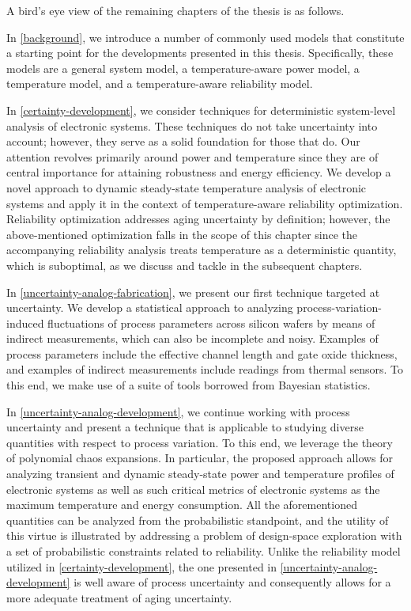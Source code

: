 A bird's eye view of the remaining chapters of the thesis is as follows.

In \cref{background}, we introduce a number of commonly used models that
constitute a starting point for the developments presented in this thesis.
Specifically, these models are a general system model, a temperature-aware power
model, a temperature model, and a temperature-aware reliability model.

In \cref{certainty-development}, we consider techniques for deterministic
system-level analysis of electronic systems. These techniques do not take
uncertainty into account; however, they serve as a solid foundation for those
that do. Our attention revolves primarily around power and temperature since
they are of central importance for attaining robustness and energy efficiency.
We develop a novel approach to dynamic steady-state temperature analysis of
electronic systems and apply it in the context of temperature-aware reliability
optimization. Reliability optimization addresses aging uncertainty by
definition; however, the above-mentioned optimization falls in the scope of this
chapter since the accompanying reliability analysis treats temperature as a
deterministic quantity, which is suboptimal, as we discuss and tackle in the
subsequent chapters.

In \cref{uncertainty-analog-fabrication}, we present our first technique
targeted at uncertainty. We develop a statistical approach to analyzing
process-variation-induced fluctuations of process parameters across silicon
wafers by means of indirect measurements, which can also be incomplete and
noisy. Examples of process parameters include the effective channel length and
gate oxide thickness, and examples of indirect measurements include readings
from thermal sensors. To this end, we make use of a suite of tools borrowed from
Bayesian statistics.

In \cref{uncertainty-analog-development}, we continue working with process
uncertainty and present a technique that is applicable to studying diverse
quantities with respect to process variation. To this end, we leverage the
theory of polynomial chaos expansions. In particular, the proposed approach
allows for analyzing transient and dynamic steady-state power and temperature
profiles of electronic systems as well as such critical metrics of electronic
systems as the maximum temperature and energy consumption. All the
aforementioned quantities can be analyzed from the probabilistic standpoint, and
the utility of this virtue is illustrated by addressing a problem of
design-space exploration with a set of probabilistic constraints related to
reliability. Unlike the reliability model utilized in
\cref{certainty-development}, the one presented in
\cref{uncertainty-analog-development} is well aware of process uncertainty and
consequently allows for a more adequate treatment of aging uncertainty.

